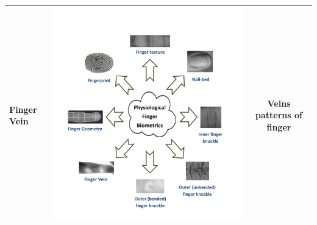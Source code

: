 \documentclass[review]{elsarticle}
\begin{document}
\begin{table}[h]
{\begin{tabular}{|C{3.7cm}|C{3.7cm}|c|}
			\textbf{Finger Vein} & \begin{minipage}{0.75\hsize}\includegraphics[page=1,scale=.5,trim=3.6cm 6.3cm 18cm 21.5cm,clip]{Finger_biometrics.pdf}\end{minipage} & Veins patterns of finger \\ \hline

\end{tabular}}
\end{table}
\end{document}

